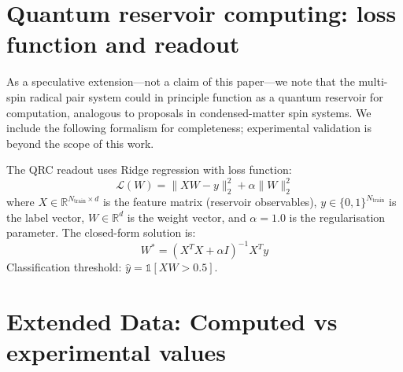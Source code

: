 \documentclass[11pt]{article}
\begin{document}
\section{Quantum reservoir computing: loss function and readout}

As a speculative extension---not a claim of this paper---we note that the multi-spin radical pair system could in principle function as a quantum reservoir for computation, analogous to proposals in condensed-matter spin systems. We include the following formalism for completeness; experimental validation is beyond the scope of this work.

The QRC readout uses Ridge regression with loss function:
\begin{equation}
\mathcal{L}(W) = \|XW - y\|_2^2 + \alpha\|W\|_2^2
\label{eq:ridge}
\end{equation}
where $X \in \mathbb{R}^{N_\mathrm{train} \times d}$ is the feature matrix (reservoir observables), $y \in \{0,1\}^{N_\mathrm{train}}$ is the label vector, $W \in \mathbb{R}^d$ is the weight vector, and $\alpha = 1.0$ is the regularisation parameter. The closed-form solution is:
\begin{equation}
W^* = (X^T X + \alpha I)^{-1} X^T y
\end{equation}
Classification threshold: $\hat{y} = \mathbb{1}[XW > 0.5]$.

\section{Extended Data: Computed vs experimental values}
\end{document}
